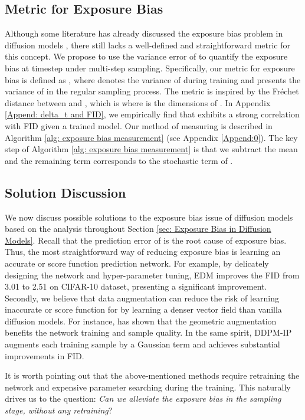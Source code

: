 \documentclass{article} \usepackage{iclr2024_conference,times}
\begin{document}
\subsection{Metric for Exposure Bias}
Although some literature has already discussed the exposure bias problem in diffusion models \citep{ning2023input, li2023alleviating}, there still lacks a well-defined and straightforward metric for this concept. We propose to use the variance error of  to quantify the exposure bias at timestep  under multi-step sampling. Specifically, our metric  for exposure bias is defined as , where  denotes the variance of  during training and  presents the variance of  in the regular sampling process. The metric  is inspired by the Fréchet distance \citep{dowson1982frechet} between  and , which is  where  is the dimensions of . In Appendix \ref{Append: delta_t and FID}, we empirically find that  exhibits a strong correlation with FID given a trained model. Our method of measuring  is described in Algorithm \ref{alg: exposure bias measurement} (see Appendix \ref{Append:0}). The key step of Algorithm \ref{alg: exposure bias measurement} is that we subtract the mean  and the remaining term  corresponds to the stochastic term of .


\subsection{Solution Discussion}
We now discuss possible solutions to the exposure bias issue of diffusion models based on the analysis throughout Section \ref{sec: Exposure Bias in Diffusion Models}. Recall that the prediction error of  is the root cause of exposure bias. Thus, the most straightforward way of reducing exposure bias is learning an accurate   or score function \citep{song2019generative} prediction network. For example, by delicately designing the network and hyper-parameter tuning, EDM \citep{karras2022elucidating} improves the FID from 3.01 to 2.51 on CIFAR-10 dataset, presenting a significant improvement. Secondly, we believe that data augmentation can reduce the risk of learning inaccurate  or score function for  by learning a denser vector field than vanilla diffusion models. For instance, \citet{karras2022elucidating} has shown that the geometric augmentation \citep{karras2020training} benefits the network training and sample quality. In the same spirit, DDPM-IP \citep{ning2023input} augments each training sample  by a Gaussian term and achieves substantial improvements in FID. 

It is worth pointing out that the above-mentioned methods require retraining the network and expensive parameter searching during the training. This naturally drives us to the question: \textit{Can we alleviate the exposure bias in the sampling stage, without any retraining}?
\end{document}
